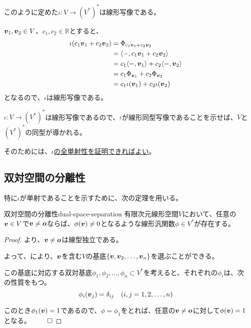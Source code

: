 \documentclass[../../../topic_linear-algebra]{subfiles}
\begin{document}
このように定めた$\iota \colon V \to (V^*)^*$は線形写像である。

\br

\begin{handout}
  $\vb*{v}_1, \vb*{v}_2 \in V$、$c_1, c_2 \in \mathbb{R}$とすると、
  \begin{align*}
    \iota(c_1 \vb*{v}_1 + c_2 \vb*{v}_2) &= \Phi_{c_1 \vb*{v}_1 + c_2 \vb*{v}_2} \\
    &= \langle -, c_1 \vb*{v}_1 + c_2 \vb*{v}_2 \rangle \\
    &= c_1 \langle -, \vb*{v}_1 \rangle + c_2 \langle -, \vb*{v}_2 \rangle \\
    &= c_1 \Phi_{\vb*{v}_1} + c_2 \Phi_{\vb*{v}_2} \\
    &= c_1 \iota(\vb*{v}_1) + c_2 \iota(\vb*{v}_2)
  \end{align*}
  となるので、$\iota$は線形写像である。
\end{handout}

\br

$\iota \colon V \to (V^*)^*$は線形写像であるので、$\iota$が線形同型写像であることを示せば、$V$と$(V^*)^*$の同型が導かれる。

そのためには、\hyperref[def:linear-isomorphism]{$\iota$の全単射性を証明できればよい}。

\subsection{双対空間の分離性}

特に$\iota$が単射であることを示すために、次の定理を用いる。

\begin{theorem}{双対空間の分離性}{dual-space-separation}
  有限次元線形空間$V$において、任意の$\vb*{v} \in V$で$\vb*{v} \neq \vb*{o}$ならば、$\phi(\vb*{v}) \neq 0$となるような線形汎関数$\phi \in V^*$が存在する。
\end{theorem}

\begin{proof}
  より、$\vb*{v} \neq \vb*{o}$は線型独立である。

  よって、により、$\vb*{v}$を含む$V$の基底$\{ \vb*{v}, \vb*{v}_2, \dots, \vb*{v}_n \}$を選ぶことができる。

  \br
  
  この基底に対応する双対基底${\phi_1, \phi_2, \dots, \phi_n} \subset V^*$を考えると、それぞれの$\phi_i$は、次の性質をもつ。
  \begin{equation*}
    \phi_i(\vb*{v}_j) = \delta_{ij} \quad (i,j=1,2,\dots,n)
  \end{equation*}
  
  このとき$\phi_1(\vb*{v}) = 1$であるので、$\phi = \phi_1$をとれば、任意の$\vb*{v} \neq \vb*{o}$に対して$\phi(\vb*{v}) = 1$となる。 $\qed$
\end{proof}
\end{document}
